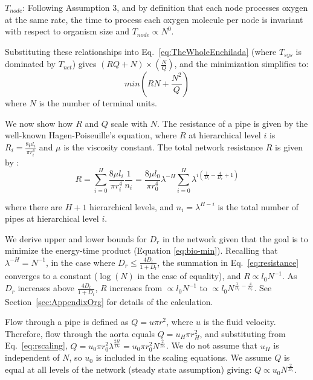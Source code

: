 \documentclass[12pt]{article}
\begin{document}
$T_{node}$: Following Assumption 3, and by definition that each node processes oxygen at the same rate, the time to process each oxygen molecule per node is invariant with respect to organism size and $T_{node} \propto N^0$.


Substituting these relationships into Eq.~\ref{eq:TheWholeEnchilada} (where $T_{sys}$ is dominated by $T_{net}$) gives
$(RQ + N) \times (\frac{N}{Q})$, and the minimization simplifies to:
\begin{equation}
 min (RN + \frac{N^2}{Q})
\label{eq:bio-min}
\end{equation}
\noindent where $N$ is the number of terminal units.  

We now show how $R$ and $Q$ scale with $N$. The resistance of a pipe is given by the well-known Hagen-Poiseuille's
equation, where $R$ at hierarchical level $i$ is $R_i = \frac{8\mu l_i}{\pi
r_i^4}$ and $\mu$ is the viscosity constant.  The total network resistance
$R$ is given by \cite{west97}:
\begin{equation}
\label{eq:resistance}
R = \sum_{i=0}^H \frac{8\mu l_i}{\pi r_i^4}\frac{1}{n_i}
= \frac{8\mu l_0}{\pi r_0^4} \lambda^{-H}\sum_{i=0}^H \lambda^{i 
\left(\frac{1}{D_l} - \frac{4}{D_r} + 1 \right)}
\end{equation}

\noindent where there are $H+1$ hierarchical levels, and $n_i = \lambda^{H-i}$
is the total number of pipes at hierarchical level $i$.  

We derive upper and lower bounds for $D_r$ in the network given that the goal
is to minimize the energy-time product (Equation \ref{eq:bio-min}).  Recalling
that $\lambda^{-H} = N^{-1}$, in the case
where $D_r \leq \frac{4D_l}{1+D_l}$, the summation in Eq.~\ref{eq:resistance} converges to a
constant ($\log(N)$ in the case of equality), and $R \propto l_0 N^{-1}$. As
$D_r$ increases above $\frac{4D_l}{1+D_l}$, $R$ increases from $\propto l_0 N^{-1}$ to $\propto
l_0 N^{\frac{1}{D_l} - \frac{4}{D_r}}$. 
See Section~\ref{sec:AppendixOrg} for details of the calculation.

Flow through a pipe is defined as $Q = u\pi r^2$, where $u$ is the fluid
velocity. 
Therefore, flow through the aorta equals $Q = u_H \pi r_{H}^2$, and
substituting from Eq.~\ref{eq:rscaling}, $Q = u_0 \pi r_0^2
\lambda^{\frac{2H}{D_r}} = u_0 \pi r_0^2N^{\frac{2}{D_r}} $.  We do not assume
that $u_H$ is independent of $N$, so $u_0$ is included in the scaling
equations.  We assume $Q$ is equal at all levels of the network (steady state
assumption) giving: $Q \propto u_0 N^{\frac{2}{D_r}}$. 
\end{document}
